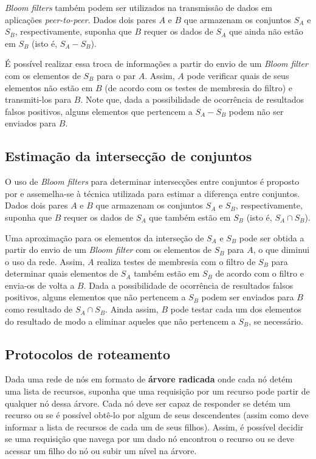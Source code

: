 \documentclass[12pt,twoside,english,brazilian]{book}
\begin{document}
\textit{Bloom filters} também podem ser utilizados na transmissão de dados em aplicações \textit{peer-to-peer}. Dados dois pares $A$ e $B$ que armazenam os conjuntos $S_A$ e $S_B$, respectivamente, suponha que $B$ requer os dados de $S_A$ que ainda não estão em $S_B$ (isto é, $S_A - S_B$).

É possível realizar essa troca de informações a partir do envio de um \textit{Bloom filter} com os elementos de $S_B$ para o par $A$. Assim, $A$ pode verificar quais de seus elementos não estão em $B$ (de acordo com os testes de membresia do filtro) e transmiti-los para $B$. Note que, dada a possibilidade de ocorrência de resultados falsos positivos, alguns elementos que pertencem a $S_A - S_B$ podem não ser enviados para $B$.

\subsection{Estimação da intersecção de conjuntos}

O uso de \textit{Bloom filters} para determinar intersecções entre conjuntos é proposto por \citet{vahdat} e assemelha-se à técnica utilizada para estimar a diferença entre conjuntos. Dados dois pares $A$ e $B$ que armazenam os conjuntos $S_A$ e $S_B$, respectivamente, suponha que $B$ requer os dados de $S_A$ que também estão em $S_B$ (isto é, $S_A \cap S_B$).

Uma aproximação para os elementos da interseção de $S_A$ e $S_B$ pode ser obtida a partir do envio de um \textit{Bloom filter} com os elementos de $S_B$ para $A$, o que diminui o uso da rede. Assim, $A$ realiza testes de membresia com o filtro de $S_B$ para determinar quais elementos de $S_A$ também estão em $S_B$ de acordo com o filtro e envia-os de volta a $B$. Dada a possibilidade de ocorrência de resultados falsos positivos, alguns elementos que não pertencem a $S_B$ podem ser enviados para $B$ como resultado de $S_A \cap S_B$. Ainda assim, $B$ pode testar cada um dos elementos do resultado de modo a eliminar aqueles que não pertencem a $S_B$, se necessário.

\subsection{Protocolos de roteamento}

Dada uma rede de nós em formato de \textbf{árvore radicada} onde cada nó detém uma lista de recursos, suponha que uma requisição por um recurso pode partir de qualquer nó dessa árvore. Cada nó deve ser capaz de responder se detém um recurso ou se é possível obtê-lo por algum de seus descendentes (assim como deve informar a lista de recursos de cada um de seus filhos). Assim, é possível decidir se uma requisição que navega por um dado nó encontrou o recurso ou se deve acessar um filho do nó ou subir um nível na árvore.
\end{document}
